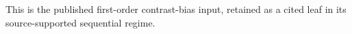 This is the published first-order contrast-bias input, retained as a cited leaf in its source-supported sequential regime.